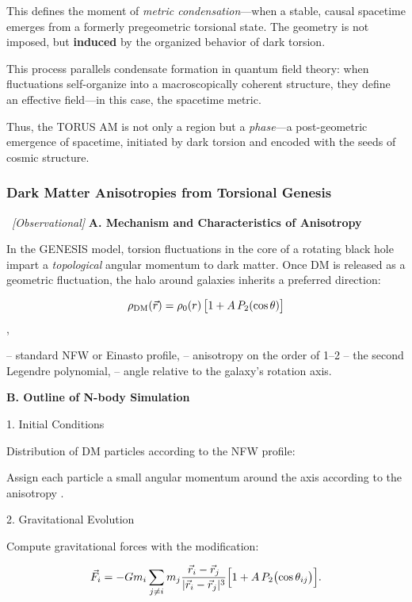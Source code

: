 \documentclass{article}
\newcommand{\obstag}{\textcolor{green!60!black}{\textit{[Observational]}}}
\begin{document}
This defines the moment of \textit{metric condensation}---when a stable, causal spacetime emerges from a formerly pregeometric torsional state. The geometry is not imposed, but \textbf{induced} by the organized behavior of dark torsion.

This process parallels condensate formation in quantum field theory: when fluctuations self-organize into a macroscopically coherent structure, they define an effective field---in this case, the spacetime metric.

Thus, the TORUS AM is not only a region but a \textit{phase}---a post-geometric emergence of spacetime, initiated by dark torsion and encoded with the seeds of cosmic structure.


\subsubsection{Dark Matter Anisotropies from Torsional Genesis}\
\obstag
 \textbf{A. Mechanism and Characteristics of Anisotropy}

In the GENESIS model, torsion fluctuations in the core of a rotating black hole impart a \emph{topological} angular momentum to dark matter. Once DM is released as a geometric fluctuation, the halo around galaxies inherits a preferred direction:

\begin{equation}
  \rho_{\rm DM}(\vec r) = \rho_0(r)\,\bigl[1 + A\,P_2(\cos\theta)\bigr]
\end{equation},

– standard NFW or Einasto profile,  
– anisotropy on the order of 1–2%
– the second Legendre polynomial,  
– angle relative to the galaxy’s rotation axis.  

\textbf{B. Outline of N-body Simulation}

1. Initial Conditions

Distribution of DM particles according to the NFW profile:

Assign each particle a small angular momentum around the axis  according to the anisotropy .

2. Gravitational Evolution

Compute gravitational forces with the modification:

\begin{equation}\label{eq:auto117}
\vec F_i = -Gm_i \sum_{j\neq i} m_j \frac{\vec r_i - \vec r_j}{|\vec r_i - \vec r_j|^3}
       \Bigl[1 + A\,P_2\bigl(\cos\theta_{ij}\bigr)\Bigr].
\end{equation}
\end{document}
